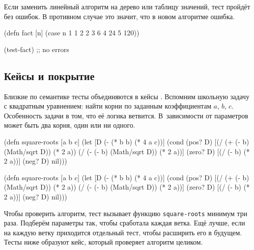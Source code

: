 Если заменить линейный алгоритм на дерево или таблицу значений, тест пройдёт без
ошибок. В противном случае это значит, что в новом алгоритме ошибка.

\begin{english}
  \begin{clojure}
(defn fact [n]
  (case n
    1 1
    2 2
    3 6
    4 24
    5 120))

(test-fact) ;; no errors
  \end{clojure}
\end{english}

\subsection{Кейсы и покрытие}


Близкие по семантике тесты объединяются в кейсы . Вспомним
школьную задачу с квадратным уравнением: найти корни по заданным коэффициентам
$a$, $b$, $c$. Особенность задачи в том, что её логика ветвится. В~зависимости
от параметров может быть два корня, один или ни одного.


\ifx\DEVICETYPE\MOBILE

\begin{english}
  \begin{clojure}
(defn square-roots [a b c]
  (let [D (- (* b b) (* 4 a c))]
    (cond
      (pos? D)
      [(/ (+ (- b) (Math/sqrt D))
          (* 2 a))
       (/ (- (- b) (Math/sqrt D))
          (* 2 a))]
      (zero? D) [(/ (- b) (* 2 a))]
      (neg? D) nil)))
  \end{clojure}
\end{english}

\else

\begin{english}
  \begin{clojure}
(defn square-roots [a b c]
  (let [D (- (* b b) (* 4 a c))]
    (cond
      (pos? D) [(/ (+ (- b) (Math/sqrt D)) (* 2 a))
                (/ (- (- b) (Math/sqrt D)) (* 2 a))]
      (zero? D) [(/ (- b) (* 2 a))]
      (neg? D) nil)))
  \end{clojure}
\end{english}

\fi


Чтобы проверить алгоритм, тест вызывает функцию \verb|square-roots| минимум три
раза. Подберём параметры так, чтобы сработала каждая ветка. Ещё лучше, если на
каждую ветку приходится отдельный тест, чтобы расширить его в будущем. Тесты ниже
образуют кейс, который проверяет алгоритм целиком.


